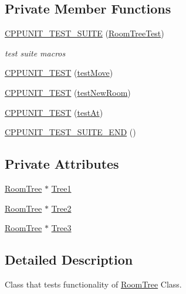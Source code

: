 \subsection*{Private Member Functions}
\begin{DoxyCompactItemize}
\item 
\hyperlink{classRoomTreeTest_a38df4c66be0d341a6d12fda7fdd1d6a4}{C\-P\-P\-U\-N\-I\-T\-\_\-\-T\-E\-S\-T\-\_\-\-S\-U\-I\-T\-E} (\hyperlink{classRoomTreeTest}{Room\-Tree\-Test})
\begin{DoxyCompactList}\small\item\em test suite macros \end{DoxyCompactList}\item 
\hyperlink{classRoomTreeTest_a0036ded2c0eebf44f7efe33a6599191e}{C\-P\-P\-U\-N\-I\-T\-\_\-\-T\-E\-S\-T} (\hyperlink{classRoomTreeTest_aab3dedfa3aaa0bfab811a8d0d8c8b7e0}{test\-Move})
\item 
\hyperlink{classRoomTreeTest_a3e253c371a946e2bc196ac4c83023c21}{C\-P\-P\-U\-N\-I\-T\-\_\-\-T\-E\-S\-T} (\hyperlink{classRoomTreeTest_a1f342a990eb4b60cfae96dac1dbbedee}{test\-New\-Room})
\item 
\hyperlink{classRoomTreeTest_a0eac4e16bb37465e894eb1a6ad74900e}{C\-P\-P\-U\-N\-I\-T\-\_\-\-T\-E\-S\-T} (\hyperlink{classRoomTreeTest_a7999cf9d9149ade6f39fbb7be601805e}{test\-At})
\item 
\hyperlink{classRoomTreeTest_a22c287ede74b7fc2591ceee86d10d85a}{C\-P\-P\-U\-N\-I\-T\-\_\-\-T\-E\-S\-T\-\_\-\-S\-U\-I\-T\-E\-\_\-\-E\-N\-D} ()
\end{DoxyCompactItemize}
\subsection*{Private Attributes}
\begin{DoxyCompactItemize}
\item 
\hyperlink{classRoomTree}{Room\-Tree} $\ast$ \hyperlink{classRoomTreeTest_aba5c37d20a82bff695de4c78a547f23f}{Tree1}
\item 
\hyperlink{classRoomTree}{Room\-Tree} $\ast$ \hyperlink{classRoomTreeTest_aada805154b8f5306805936f0ba43834c}{Tree2}
\item 
\hyperlink{classRoomTree}{Room\-Tree} $\ast$ \hyperlink{classRoomTreeTest_aa70878ec1fa44e95f78e59a236572b27}{Tree3}
\end{DoxyCompactItemize}


\subsection{Detailed Description}
Class that tests functionality of \hyperlink{classRoomTree}{Room\-Tree} Class. 

